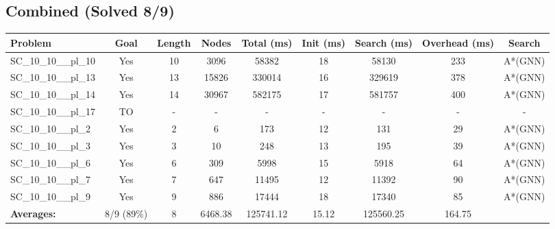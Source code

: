 \documentclass{article}
\begin{document}
\subsection*{Combined (Solved 8/9)}
\begin{tabular}{lcccccccc}
\toprule
Problem & Goal & Length & Nodes & Total (ms) & Init (ms) & Search (ms) & Overhead (ms) & Search \\
\midrule
SC\_10\_10\_\_pl\_10 & Yes & 10 & 3096 & 58382 & 18 & 58130 & 233 & A*(GNN) \\
SC\_10\_10\_\_pl\_13 & Yes & 13 & 15826 & 330014 & 16 & 329619 & 378 & A*(GNN) \\
SC\_10\_10\_\_pl\_14 & Yes & 14 & 30967 & 582175 & 17 & 581757 & 400 & A*(GNN) \\
SC\_10\_10\_\_pl\_17 & TO & - & - & - & - & - & - & - \\
SC\_10\_10\_\_pl\_2 & Yes & 2 & 6 & 173 & 12 & 131 & 29 & A*(GNN) \\
SC\_10\_10\_\_pl\_3 & Yes & 3 & 10 & 248 & 13 & 195 & 39 & A*(GNN) \\
SC\_10\_10\_\_pl\_6 & Yes & 6 & 309 & 5998 & 15 & 5918 & 64 & A*(GNN) \\
SC\_10\_10\_\_pl\_7 & Yes & 7 & 647 & 11495 & 12 & 11392 & 90 & A*(GNN) \\
SC\_10\_10\_\_pl\_9 & Yes & 9 & 886 & 17444 & 18 & 17340 & 85 & A*(GNN) \\
\textbf{Averages:} & 8/9 (89\%) & 8 & 6468.38 & 125741.12 & 15.12 & 125560.25 & 164.75 & \\
\bottomrule
\end{tabular}
\\[0.7cm]
\end{document}
